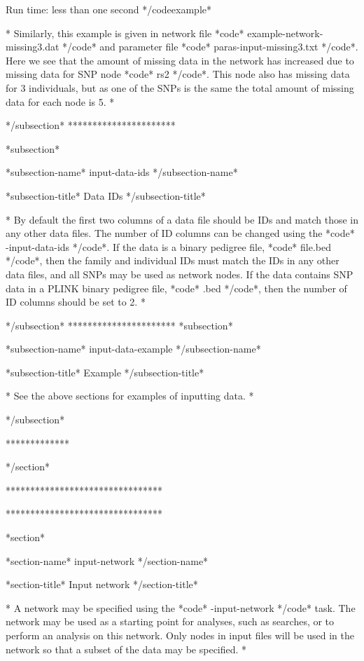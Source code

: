 Run time: less than one second */codeexample*

* Similarly, this example is given in network file *code* example-network-missing3.dat */code* and parameter file *code* paras-input-missing3.txt */code*. Here we see that the amount of missing data in the network has increased due to missing data for SNP node *code* rs2 */code*. This node also has missing data for 3 individuals, but as one of the SNPs is the same the total amount of missing data for each node is 5. *

*/subsection* **********************

*subsection*

*subsection-name* input-data-ids */subsection-name*

*subsection-title* Data IDs */subsection-title*

* By default the first two columns of a data file should be IDs and match those in any other data files. The number of ID columns can be changed using the *code* -input-data-ids */code*. If the data is a binary pedigree file, *code* file.bed */code*, then the family and individual IDs must match the IDs in any other data files, and all SNPs may be used as network nodes. If the data contains SNP data in a PLINK binary pedigree file, *code* .bed */code*, then the number of ID columns should be set to 2. *


*/subsection* ********************** *subsection*

*subsection-name* input-data-example */subsection-name*

*subsection-title* Example */subsection-title*

* See the above sections for examples of inputting data. *


*/subsection*

*************

*/section*

********************************

 ********************************

*section*

*section-name* input-network */section-name*

*section-title* Input network */section-title*

* A network may be specified using the *code* -input-network */code* task. The network may be used as a starting point for analyses, such as searches, or to perform an analysis on this network. Only nodes in input files will be used in the network so that a subset of the data may be specified. *


